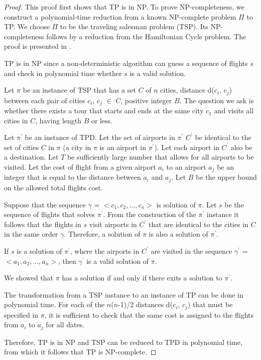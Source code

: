 \documentclass{article}
\theoremstyle{definition}
\begin{document}
\begin{proof}
This proof first shows that TP is in NP. To prove NP-completeness, we construct a polynomial-time reduction from a known NP-complete problem $\Pi$ to TP. We choose $\Pi$ to be the traveling salesman problem (TSP). Its NP-completeness follows by a reduction from the Hamiltonian Cycle problem. The proof is presented in \cite{thebible}.

TP is in NP since a non-deterministic algorithm can guess a sequence of flights $s$ and check in polynomial time whether $s$ is a valid solution.

Let $\pi$ be an instance of TSP that has a set $C$ of $n$ cities, distance d($c_{i}$, $c_{j}$) between each pair of cities $c_{i}$, $c_{j}$ $\in$ $C$, positive integer $B$. The question we ask is whether there exists a tour that starts and ends at the same city $c_{1}$ and visits all cities in $C$, having length $B$ or less.

Let $\pi^{\prime}$ be an instance of TPD. Let the set of airports in $\pi^{\prime}$ $C^{\prime}$ be identical to the set of cities $C$ in $\pi$ (a city in $\pi$ is an airport in $\pi^{\prime}$). Let each airport in $C^{\prime}$ also be a destination. Let $T$ be sufficiently large number that allows for all airports to be visited. Let the cost of flight from a given airport $a_{i}$ to an airport $a_{j}$ be an integer that is equal to the distance between $a_{i}$ and $a_{j}$. Let $B$ be the upper bound on the allowed total flights cost.

Suppose that the sequence $\gamma$ = $<c_{1}, c_{2},...,c_{n}>$ is solution of $\pi$. Let $s$ be the sequence of flights that solves $\pi^{\prime}$. From the construction of the $\pi^{\prime}$ instance it follows that the flights in $s$ visit airports in $C^{\prime}$ that are identical to the cities in $C$ in the same order $\gamma$. Therefore, a solution of $\pi$ is also a solution of $\pi^{\prime}$. 

If $s$ is a solution of $\pi^{\prime}$, where the airports in $C^{\prime}$ are visited in the sequence $\gamma^{\prime}$ = $<a_{1}, a_{2},...,a_{n}>$, then $\gamma^{\prime}$ is a valid solution of $\pi$.

We showed that $\pi$ has a solution if and only if there exits a solution to $\pi^{\prime}$.

The transformation from a TSP instance to an instance of TP can be done in polynomial time. For each of the $n$($n$-1)/2 distances d($c_{i}$, $c_{j}$) that must be specified in $\pi$, it is sufficient to check that the same cost is assigned to the flights from $a_{i}$ to $a_{j}$ for all dates.

Therefore, TP is in NP and TSP can be reduced to TPD in polynomial time, from which it follows that TP is NP-complete.

\end{proof}
\end{document}
